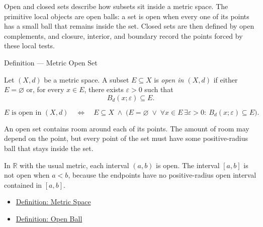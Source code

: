 \begin{remark*}[Exposition]
Open and closed sets describe how subsets sit inside a metric space.  The
primitive local objects are open balls: a set is open when every one of its
points has a small ball that remains inside the set.  Closed sets are then
defined by open complements, and closure, interior, and boundary record the
points forced by these local tests.
\end{remark*}

\begin{definitionbox}{Definition --- Metric Open Set}
\begin{definition}\label{def:metric-open-set}
Let \((X,d)\) be a metric space.  A subset \(E\subseteq X\) is \emph{open in
\((X,d)\)} if either \(E=\varnothing\) or, for every \(x\in E\), there exists
\(\varepsilon>0\) such that
\[
  B_d(x;\varepsilon)\subseteq E.
\]
\end{definition}
\end{definitionbox}

\begin{remark*}
\[
E\text{ is open in }(X,d)
\quad\Longleftrightarrow\quad
E\subseteq X
\;\land\;
\bigl(E=\varnothing
\;\lor\;
\forall x\in E\,\exists\varepsilon>0{:}\ B_d(x;\varepsilon)\subseteq E\bigr).
\]
\end{remark*}

\begin{remark*}[Interpretation]
An open set contains room around each of its points.  The amount of room may
depend on the point, but every point of the set must have some positive-radius
ball that stays inside the set.
\end{remark*}

\begin{remark*}[Examples]
In \(\mathbb{R}\) with the usual metric, each interval \((a,b)\) is open.
The interval \([a,b]\) is not open when \(a<b\), because the endpoints have no
positive-radius open interval contained in \([a,b]\).
\end{remark*}

\begin{dependencies}
\begin{itemize}
  \item \hyperref[def:metric-space]{Definition: Metric Space}
  \item \hyperref[def:metric-open-ball]{Definition: Open Ball}
\end{itemize}
\end{dependencies}


